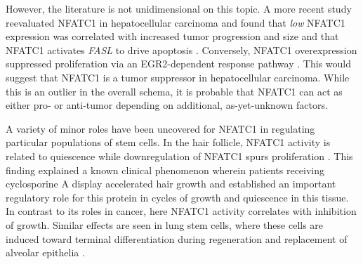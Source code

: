 However, the literature is not unidimensional on this topic. A more recent study reevaluated NFATC1 in hepatocellular carcinoma and found that \textit{low} NFATC1 expression was correlated with increased tumor progression and size and that NFATC1 activates \textit{FASL} to drive apoptosis \citep{Xu2018}. Conversely, NFATC1 overexpression suppressed proliferation via an EGR2\hyp{}dependent response pathway \citep{Wang2020}. This would suggest that NFATC1 is a tumor suppressor in hepatocellular carcinoma. While this is an outlier in the overall schema, it is probable that NFATC1 can act as either pro\hyp{} or anti\hyp{}tumor depending on additional, as\hyp{}yet\hyp{}unknown factors. 

A variety of minor roles have been uncovered for NFATC1 in regulating particular populations of stem cells. In the hair follicle, NFATC1 activity is related to quiescence while downregulation of NFATC1 spurs proliferation \citep{Horsley2008, Keyes2013}. This finding explained a known clinical phenomenon wherein patients receiving cyclosporine A display accelerated hair growth and established an important regulatory role for this protein in cycles of growth and quiescence in this tissue. In contrast to its roles in cancer, here NFATC1 activity correlates with inhibition of growth. Similar effects are seen in lung stem cells, where these cells are induced toward terminal differentiation during regeneration and replacement of alveolar epithelia \citep{Lee2014}.

